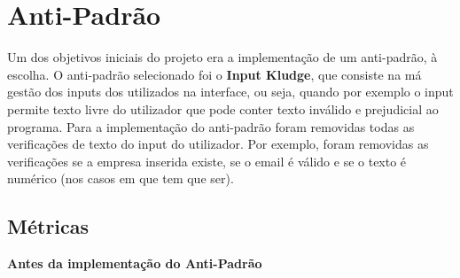 \section{Anti-Padrão}\label{sec:ap}

Um dos objetivos iniciais do projeto era a implementação de um anti-padrão, à escolha. O anti-padrão selecionado foi o \textbf{Input Kludge}, que consiste na má gestão dos inputs dos utilizados na interface, ou seja, quando por exemplo o input permite texto livre do utilizador que pode conter texto inválido e prejudicial ao programa.
\newline Para a implementação do anti-padrão foram removidas todas as verificações de texto do input do utilizador. Por exemplo, foram removidas as verificações se a empresa inserida existe, se o email é válido e se o texto é numérico (nos casos em que tem que ser).
\newpage

\subsection{Métricas}

\textbf{Antes da implementação do Anti-Padrão}


